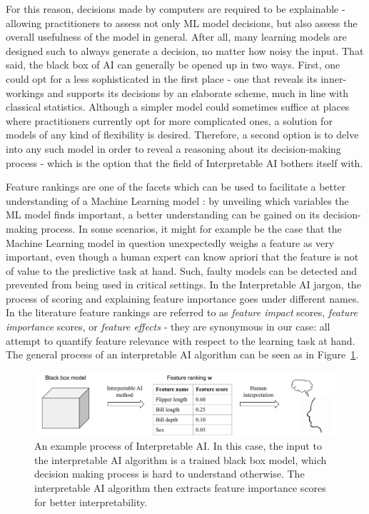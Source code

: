 \documentclass{article}
\begin{document}
For this reason, decisions made by computers are required to be explainable - allowing practitioners to assess not only ML model decisions, but also assess the overall usefulness of the model in general. After all, many learning models are designed such to always generate a decision, no matter how noisy the input. That said, the black box of AI can generally be opened up in two ways. First, one could opt for a less sophisticated in the first place - one that reveals its inner-workings and supports its decisions by an elaborate scheme, much in line with classical statistics. Although a simpler model could sometimes suffice at places where practitioners currently opt for more complicated ones, a solution for models of any kind of flexibility is desired. Therefore, a second option is to delve into any such model in order to reveal a reasoning about its decision-making process - which is the option that the field of Interpretable AI bothers itself with.

Feature rankings are one of the facets which can be used to facilitate a better understanding of a Machine Learning model \citep{hansen_interpretability_2019}: by unveiling which variables the ML model finds important, a better understanding can be gained on its decision-making process. In some scenarios, it might for example be the case that the Machine Learning model in question unexpectedly weighs a feature as very important, even though a human expert can know apriori that the feature is not of value to the predictive task at hand. Such, faulty models can be detected and prevented from being used in critical settings. In the Interpretable AI jargon, the process of scoring and explaining feature importance goes under different names. In the literature feature rankings are referred to as \textit{feature impact} scores, \textit{feature importance} scores, or \textit{feature effects} - they are synonymous in our case: all attempt to quantify feature relevance with respect to the learning task at hand. The general process of an interpretable AI algorithm can be seen as in Figure~\ref{fig:schematic-interpretable-ai}.

\begin{figure}[ht]
    \centering
    \includegraphics[width=\linewidth]{report/images/schematic-interpretable-ai.pdf}
    \caption{An example process of Interpretable AI. In this case, the input to the interpretable AI algorithm is a trained black box model, which decision making process is hard to understand otherwise. The interpretable AI algorithm then extracts feature importance scores for better interpretability.}
    \label{fig:schematic-interpretable-ai}
\end{figure}
\end{document}
